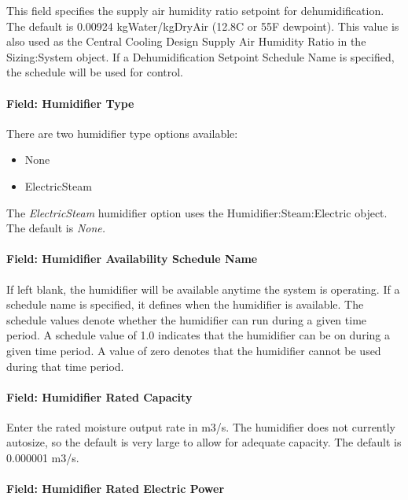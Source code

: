 This field specifies the supply air humidity ratio setpoint for dehumidification. The default is 0.00924 kgWater/kgDryAir (12.8C or 55F dewpoint). This value is also used as the Central Cooling Design Supply Air Humidity Ratio in the Sizing:System object. If a Dehumidification Setpoint Schedule Name is specified, the schedule will be used for control.

\paragraph{Field: Humidifier Type}\label{field-humidifier-type-7}

There are two humidifier type options available:

\begin{itemize}
\item
  None
\item
  ElectricSteam
\end{itemize}

The \emph{ElectricSteam} humidifier option uses the Humidifier:Steam:Electric object. The default is \emph{None.}

\paragraph{Field: Humidifier Availability Schedule Name}\label{field-humidifier-availability-schedule-name-7}

If left blank, the humidifier will be available anytime the system is operating. If a schedule name is specified, it defines when the humidifier is available. The schedule values denote whether the humidifier can run during a given time period. A schedule value of 1.0 indicates that the humidifier can be on during a given time period. A value of zero denotes that the humidifier cannot be used during that time period.

\paragraph{Field: Humidifier Rated Capacity}\label{field-humidifier-rated-capacity-7}

Enter the rated moisture output rate in m3/s. The humidifier does not currently autosize, so the default is very large to allow for adequate capacity. The default is 0.000001 m3/s.

\paragraph{Field: Humidifier Rated Electric Power}\label{field-humidifier-rated-electric-power-7}

